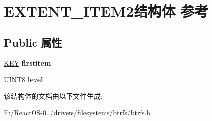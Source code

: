 \hypertarget{struct_e_x_t_e_n_t___i_t_e_m2}{}\section{E\+X\+T\+E\+N\+T\+\_\+\+I\+T\+E\+M2结构体 参考}
\label{struct_e_x_t_e_n_t___i_t_e_m2}
\subsection*{Public 属性}
\begin{DoxyCompactItemize}
\item 
\mbox{\label{struct_e_x_t_e_n_t___i_t_e_m2_a68ad67fddf062e3886388cc9235069c4}} 
\hyperlink{struct_k_e_y}{K\+EY} {\bfseries firstitem}
\item 
\mbox{\label{struct_e_x_t_e_n_t___i_t_e_m2_ae9cf859d383b89b2724ef0db2bf936af}} 
\hyperlink{_processor_bind_8h_ab27e9918b538ce9d8ca692479b375b6a}{U\+I\+N\+T8} {\bfseries level}
\end{DoxyCompactItemize}


该结构体的文档由以下文件生成\+:\begin{DoxyCompactItemize}
\item 
E\+:/\+React\+O\+S-\/0../drivers/filesystems/btrfs/btrfs.\+h\end{DoxyCompactItemize}
